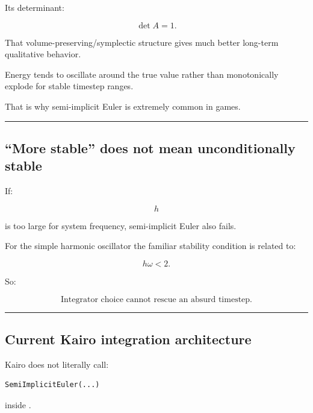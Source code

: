Its determinant:

\[
\det A=1.
\]

That volume-preserving/symplectic structure gives much better long-term qualitative behavior.

Energy tends to oscillate around the true value rather than monotonically explode for stable timestep ranges.

That is why semi-implicit Euler is extremely common in games.

\begin{center}\rule{0.5\linewidth}{0.5pt}\end{center}

\subsection{``More stable'' does not mean unconditionally stable}\label{06-engine-ii-ch037-more-stable-does-not-mean-unconditionally-stable}

\hypertarget{06-engine-ii-ch037-more-stable-does-not-mean-unconditionally-stable}{}

If:

\[
h
\]

is too large for system frequency, semi-implicit Euler also fails.

For the simple harmonic oscillator the familiar stability condition is related to:

\[
h\omega<2.
\]

So:

\[
\boxed{
\text{Integrator choice cannot rescue an absurd timestep.}
}
\]

\begin{center}\rule{0.5\linewidth}{0.5pt}\end{center}

\subsection{Current Kairo integration architecture}\label{06-engine-ii-ch037-current-kairo-integration-architecture}

\hypertarget{06-engine-ii-ch037-current-kairo-integration-architecture}{}

Kairo does not literally call:

\begin{verbatim}
SemiImplicitEuler(...)
\end{verbatim}

inside .


